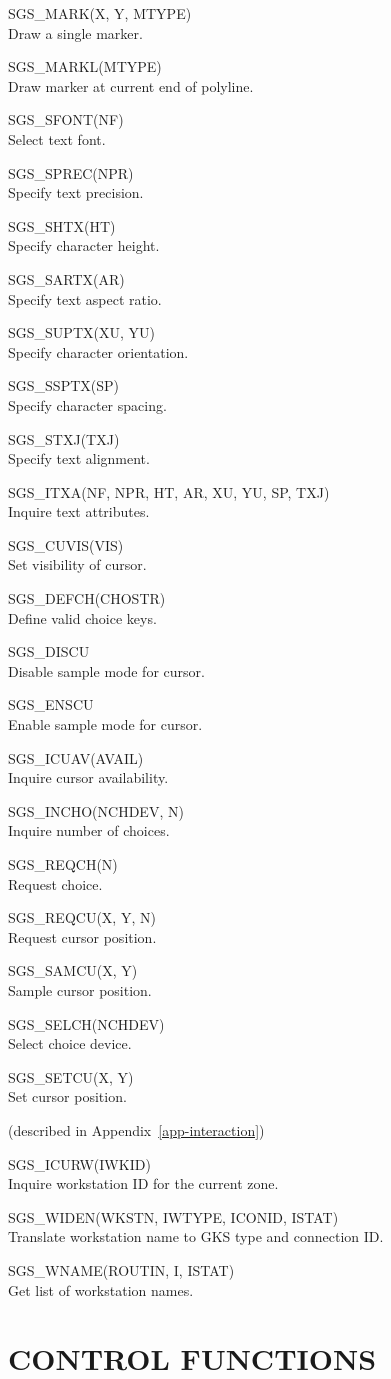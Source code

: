\documentclass[11pt]{article}
\newcommand{\hyperref}[4]{#2\ref{#4}#3}
\newcommand{\htmlref}[2]{#1}
\newcommand{\routinehead}[1]{\vspace{\bigskipamount}{\large\bf#1}}
\newenvironment{routinelist}{\begin{list}{}{\setlength{\leftmargin}{2cm}
                             \setlength{\parsep}{\smallskipamount}}}{\end{list}}
\newcommand{\routine}[2]{\item\hspace{-1cm}#1#2\\}
\newcommand{\routinehead}[1]{\subsection{#1}}
\newcommand{\routine}[2]{\item \htmlref{#1}{#1}#2\\}
\begin{document}
\routinehead{Plotting Markers}
\begin{routinelist}
\routine {SGS\_MARK}{(X, Y, MTYPE)}
   Draw a single marker.
\routine {SGS\_MARKL}{(MTYPE)}
   Draw marker at current end of polyline.
\end{routinelist}

\routinehead{Attributes of Characters}
\begin{routinelist}
\routine {SGS\_SFONT}{(NF)}
   Select text font.
\routine {SGS\_SPREC}{(NPR)}
   Specify text precision.
\routine {SGS\_SHTX}{(HT)}
   Specify character height.
\routine {SGS\_SARTX}{(AR)}
   Specify text aspect ratio.
\routine {SGS\_SUPTX}{(XU, YU)}
   Specify character orientation.
\routine {SGS\_SSPTX}{(SP)}
   Specify character spacing.
\routine {SGS\_STXJ}{(TXJ)}
   Specify text alignment.
\routine {SGS\_ITXA}{(NF, NPR, HT, AR, XU, YU, SP, TXJ)}
   Inquire text attributes.
\end{routinelist}

\routinehead{Input}
\begin{routinelist}
\routine {SGS\_CUVIS}{(VIS)}
   Set visibility of cursor.
\routine {SGS\_DEFCH}{(CHOSTR)}
   Define valid choice keys.
\routine {SGS\_DISCU}{}
   Disable sample mode for cursor.
\routine {SGS\_ENSCU}{}
   Enable sample mode for cursor.
\routine {SGS\_ICUAV}{(AVAIL)}
   Inquire cursor availability.
\routine {SGS\_INCHO}{(NCHDEV, N)}
   Inquire number of choices.
\routine {SGS\_REQCH}{(N)}
   Request choice.
\routine {SGS\_REQCU}{(X, Y, N)}
   Request cursor position.
\routine {SGS\_SAMCU}{(X, Y)}
   Sample cursor position.
\routine {SGS\_SELCH}{(NCHDEV)}
   Select choice device.
\routine {SGS\_SETCU}{(X, Y)}
   Set cursor position.
\end{routinelist}

\routinehead{GKS Inquiries} (described in
\hyperref{this appendix}{Appendix~}{}{app-interaction})
\begin{routinelist}
\routine {SGS\_ICURW}{(IWKID)}
   Inquire workstation ID for the current zone.
\routine {SGS\_WIDEN}{(WKSTN, IWTYPE, ICONID, ISTAT)}
   Translate workstation name to GKS type and connection ID.
\routine {SGS\_WNAME}{(ROUTIN, I, ISTAT)}
   Get list of workstation names.
\end{routinelist}
                                         
\section {CONTROL FUNCTIONS}\label{sec-control}
\end{document}
